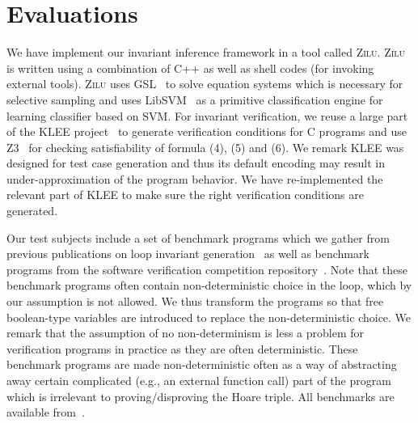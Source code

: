 
\section{Evaluations} %
\label{sec:evaluations}
We have implement our invariant inference framework in a tool called \textsc{Zilu}. \textsc{Zilu} is written using a combination of C++ as well as shell codes (for invoking external tools).
\textsc{Zilu} uses GSL~\cite{gough2009gnu} to solve equation systems which is necessary for selective sampling and uses LibSVM~\cite{chang2011libsvm} as a primitive classification engine for learning classifier based on SVM. For invariant verification, we reuse a large part of the KLEE project~\cite{cadar2008klee} to generate verification conditions for C programs and use Z3~\cite{de2008z3} for checking satisfiability of formula (4), (5) and (6). We remark KLEE was designed for test case generation and thus its default encoding may result in under-approximation of the program behavior. We have re-implemented the relevant part of KLEE to make sure the right verification conditions are generated.

Our test subjects include a set of benchmark programs which we gather from previous publications on loop invariant generation~\cite{???} as well as benchmark programs from the software verification competition repository~\cite{???}. Note that these benchmark programs often contain non-deterministic choice in the loop, which by our assumption is not allowed. We thus transform the programs so that free boolean-type variables are introduced to replace the non-deterministic choice. We remark that the assumption of no non-determinism is less a problem for verification programs in practice as they are often deterministic. These benchmark programs are made non-deterministic often as a way of abstracting away certain complicated (e.g., an external function call) part of the program which is irrelevant to proving/disproving the Hoare triple.
All benchmarks are available from~\cite{zilu}.

